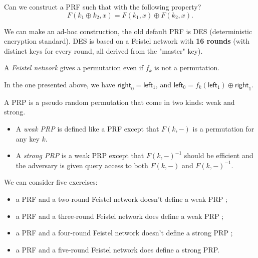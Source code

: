 \documentclass[./main]{subfiles}
\begin{document}
  Can we construct a PRF such that with the following property?
  \[
  F(k_1 \oplus k_2, x) = F(k_1, x) \oplus F(k_2, x)
  .\]

  We can make an ad-hoc construction, the old default PRF is DES (deterministic encryption standard).
  DES  is based on a Feistel network with \textbf{16 rounds} (with distinct keys for every round, all derived from the "master" key).


  \begin{figure}
    \centering
  \end{figure}

  A \textit{Feistel network} gives a permutation even if $f_k$ is not a permutation.

  In the one presented above, we have $\mathsf{right}_0 = \mathsf{left}_1$, and $\mathsf{left}_0 = f_k(\mathsf{left}_1) \oplus \mathsf{right}_1$.

  A PRP is a pseudo random permutation that come in two kinds: weak and strong.
  \begin{itemize}
    \item A \textit{weak PRP} is defined like a PRF except that $F(k, -)$ is a permutation for any key $k$.
    \item A \textit{strong PRP} is a weak PRP except that $F(k, -)^{-1}$ should be efficient and the adversary is  given query access to both $F(k, -)$ and  $F(k, -)^{-1}$.
  \end{itemize}

  We can consider five exercises:
  \begin{itemize}
    \item a PRF and a two-round Feistel network doesn't define a weak PRP ;
    \item a PRF and a three-round Feistel network does define a weak PRP ;
    \item a PRF and a four-round Feistel network doesn't define a strong PRP ;
    \item a PRF and a five-round Feistel network does define a strong PRP.
  \end{itemize}
\end{document}
